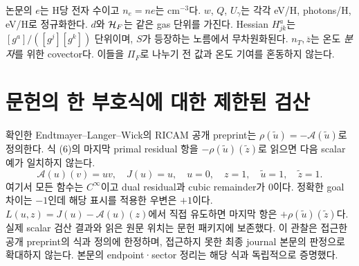 논문의 $e$는 H당 전자 수이고 $n_e=ne$는 cm$^{-3}$다. $w$, $Q$, $U_\gamma$는 각각 eV/H, photons/H, eV/H로 정규화한다. $d$와 $\mathcal H_F$는 같은 gas 단위를 가진다. Hessian $H^a_{jk}$는 $[g^a]/([g^j][g^k])$ 단위이며, $S$가 등장하는 노름에서 무차원화된다. $n_T,\overline z$는 온도 \emph{분자}를 위한 covector다. 이들을 $\Pi_F$로 나누기 전 값과 온도 기여를 혼동하지 않는다.

\section{문헌의 한 부호식에 대한 제한된 검산}\label{app:literaturesign}
확인한 Endtmayer--Langer--Wick의 RICAM 공개 preprint는 $\rho(\widetilde u)=-\mathcal A(\widetilde u)$로 정의한다. 식 (6)의 마지막 primal residual 항을 $-\rho(\widetilde u)(\widetilde z)$로 읽으면 다음 scalar 예가 일치하지 않는다.\cite{Endtmayer2019,lit16}
\begin{equation}
\mathcal A(u)(v)=uv,\quad J(u)=u,\quad
u=0,\quad z=1,\quad\widetilde u=1,\quad\widetilde z=1.
\end{equation}
여기서 모든 함수는 $C^\infty$이고 dual residual과 cubic remainder가 0이다. 정확한 goal 차이는 $-1$인데 해당 표시를 적용한 우변은 $+1$이다. $L(u,z)=J(u)-\mathcal A(u)(z)$에서 직접 유도하면 마지막 항은 $+\rho(\widetilde u)(\widetilde z)$다. 실제 scalar 검산 결과와 읽은 원문 위치는 문헌 패키지에 보존했다. 이 관찰은 접근한 공개 preprint의 식과 정의에 한정하며, 접근하지 못한 최종 journal 본문의 판정으로 확대하지 않는다. 본문의 endpoint·sector 정리는 해당 식과 독립적으로 증명했다.

